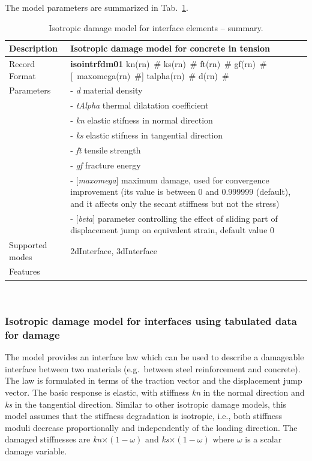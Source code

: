 \documentclass[a4paper]{article}
\newcommand{\descitem}[1]{{\noindent \bf #1}}
\newcommand{\elemparam}[2]{{{#1\tiny (#2)}~\#}}
\newcommand{\optelemparam}[2]{[{~\elemparam{#1}{#2}}]}
\newcommand{\param}[1]{{\it #1}}
\newcommand{\optparam}[1]{[{\it #1}]}
\newenvironment{mmt}{\begin{tabular}{|l|p{9cm}|}}{\end{tabular}\\}
\newenvironment{mmt}{\begin{tabular}{|l|l|}}{\end{tabular}\\}
\begin{document}
The model parameters are summarized in Tab.~\ref{iid_table}. 
\begin{table}[!htb]
  \small
\begin{mmt}
\hline
Description & Isotropic damage model for concrete in tension\\
\hline
Record Format & \descitem{isointrfdm01} 
\elemparam{kn}{rn} \elemparam{ks}{rn} \elemparam{ft}{rn} \elemparam{gf}{rn} \optelemparam{maxomega}{rn} \elemparam{talpha}{rn} \elemparam{d}{rn}\\
Parameters & - \param{d} material density\\
&- \param{tAlpha} thermal dilatation coefficient\\
&- \param{kn} elastic stifness in normal direction\\
&- \param{ks} elastic stifness in tangential direction\\
&- \param{ft} tensile strength\\
&- \param{gf} fracture energy\\
&- \optparam{maxomega} maximum damage, used for convergence improvement
(its value is between 0 and 0.999999 (default), 
and it affects only the secant stiffness but not the stress)\\
&- \optparam{beta} parameter controlling the effect of sliding part of displacement jump on equivalent strain, default value 0\\
Supported modes& 2dInterface, 3dInterface\\
Features & \\
\hline
\end{mmt}
\caption{Isotropic damage model for interface elements -- summary.}
\label{iid_table}
\end{table}

\subsubsection{Isotropic damage model for interfaces using tabulated data for damage}
\label{sec:idmfiTabulated}

The model provides an interface law which can be used to describe a damageable interface between two materials (e.g.\ between steel reinforcement and concrete). The law is formulated in terms of the traction vector and the displacement jump vector. The basic response is elastic, with stiffness \param{kn} in 
the normal direction and \param{ks} in the tangential direction.
Similar to other isotropic damage models, this model assumes that the stiffness degradation is isotropic, i.e., both stiffness moduli decrease proportionally and independently of the loading 
direction. The damaged stiffnesses are \param{kn}$\times(1-\omega)$ and \param{ks}$\times(1-\omega)$ where $\omega$ is a scalar damage variable.
\end{document}

